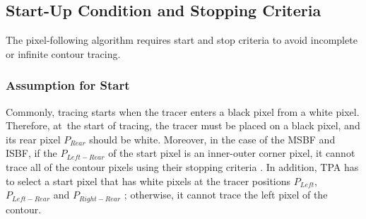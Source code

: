 \documentclass[sensors,article,accept,moreauthors,pdftex,10pt,a4paper]{mdpi}
\begin{document}
\subsection{Start-Up Condition and Stopping Criteria}

The pixel-following algorithm requires start and stop criteria to avoid incomplete or infinite contour tracing.

\subsubsection{Assumption for Start}


Commonly, tracing starts when the tracer enters a black pixel from a white pixel. Therefore, at~the start of tracing, the tracer must be placed on a black pixel, and its rear pixel $P_{Rear}$ should be white. Moreover, in the case of the MSBF and ISBF, if the $P_{Left-Rear}$ of the start pixel is an inner-outer corner pixel, it cannot trace all of the contour pixels using their stopping criteria \cite{Reddy2012Evaluation,Cheong2012Advanced}. In addition, TPA has to select a start pixel that has white pixels at the tracer positions $P_{Left}$, $P_{Left-Rear}$ and $P_{Right-Rear}$ \cite{Ghuneim2015Contour}; otherwise, it cannot trace the left pixel of the contour. 
\end{document}
